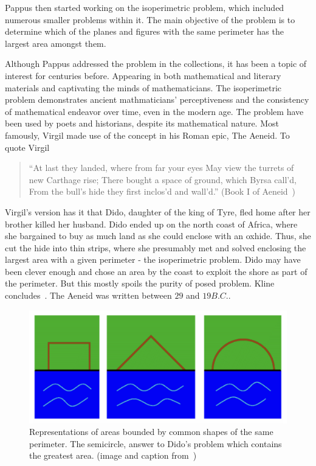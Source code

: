 \documentclass[a4paper]{book}
\numberwithin{theorem}{section}%
\begin{document}
Pappus then started working on the isoperimetric problem, which included numerous smaller problems within it. The main objective of the problem is to determine which of the planes and figures with the same perimeter has the largest area amongst them.

Although Pappus addressed the problem in the collections, it has been a topic of interest for centuries before. Appearing in both mathematical and literary materials and captivating the minds of mathematicians. 
\newline
\newline
The isoperimetric problem demonstrates ancient mathmaticians' perceptiveness and the consistency of mathematical endeavor over time, even in the modern age. The problem have been used by poets and historians, despite its mathematical nature. Most famously, Virgil made use of the concept in his Roman epic, The Aeneid. To quote Virgil
\begin{center}
    \begin{quote}
        ``At last they landed, where from far your eyes
        May view the turrets of new Carthage rise;
        There bought a space of ground, which Byrsa call'd,
        From the bull's hide they first inclos'd and wall'd.'' (Book I of Aeneid~\citep{virgil1981aeneid})
    \end{quote}
    
\end{center}

Virgil's version has it that Dido, daughter of the king of Tyre, fled home after her brother killed her husband. Dido ended up on the north coast of Africa, where she bargained to buy as much land as she could enclose with an oxhide. Thus, she cut the hide into thin strips, where she presumably met and solved enclosing the largest area with a given perimeter - the isoperimetric problem. Dido may have been clever enough and chose an area by the coast to exploit the shore as part of the perimeter. But this mostly spoils the purity of posed problem. Kline concludes~\citep{kline1985mathematics}. The Aeneid was written between $29$ and $19 B.C.$.
\begin{figure}[hbt!]
    \begin{center}   
        \includegraphics[width=130mm]{dido_1}
        \caption{Representations of areas bounded by common shapes of the same perimeter. The semicircle, answer to Dido's problem which contains the greatest area. (image and caption from~\citep{demjanenko2008isoperimetric})}
    \end{center}
\end{figure}\leavevmode \\
\end{document}
